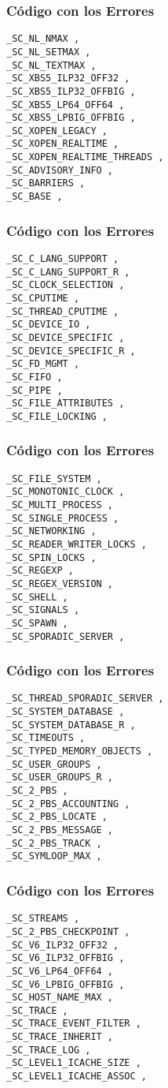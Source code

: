 \documentclass{beamer}
\begin{document}
\begin{frame}[fragile]
\frametitle{C\'odigo con los Errores}
\begin{verbatim}
_SC_NL_NMAX , 
_SC_NL_SETMAX , 
_SC_NL_TEXTMAX , 
_SC_XBS5_ILP32_OFF32 , 
_SC_XBS5_ILP32_OFFBIG , 
_SC_XBS5_LP64_OFF64 , 
_SC_XBS5_LPBIG_OFFBIG , 
_SC_XOPEN_LEGACY , 
_SC_XOPEN_REALTIME , 
_SC_XOPEN_REALTIME_THREADS , 
_SC_ADVISORY_INFO , 
_SC_BARRIERS , 
_SC_BASE , 
\end{verbatim}
\end{frame}
\begin{frame}[fragile]
\frametitle{C\'odigo con los Errores}
\begin{verbatim}
_SC_C_LANG_SUPPORT , 
_SC_C_LANG_SUPPORT_R , 
_SC_CLOCK_SELECTION , 
_SC_CPUTIME , 
_SC_THREAD_CPUTIME , 
_SC_DEVICE_IO , 
_SC_DEVICE_SPECIFIC , 
_SC_DEVICE_SPECIFIC_R , 
_SC_FD_MGMT , 
_SC_FIFO , 
_SC_PIPE , 
_SC_FILE_ATTRIBUTES , 
_SC_FILE_LOCKING , 
\end{verbatim}
\end{frame}
\begin{frame}[fragile]
\frametitle{C\'odigo con los Errores}
\begin{verbatim}
_SC_FILE_SYSTEM , 
_SC_MONOTONIC_CLOCK , 
_SC_MULTI_PROCESS , 
_SC_SINGLE_PROCESS , 
_SC_NETWORKING , 
_SC_READER_WRITER_LOCKS , 
_SC_SPIN_LOCKS , 
_SC_REGEXP , 
_SC_REGEX_VERSION , 
_SC_SHELL , 
_SC_SIGNALS , 
_SC_SPAWN , 
_SC_SPORADIC_SERVER , 
\end{verbatim}
\end{frame}
\begin{frame}[fragile]
\frametitle{C\'odigo con los Errores}
\begin{verbatim}
_SC_THREAD_SPORADIC_SERVER , 
_SC_SYSTEM_DATABASE , 
_SC_SYSTEM_DATABASE_R , 
_SC_TIMEOUTS , 
_SC_TYPED_MEMORY_OBJECTS , 
_SC_USER_GROUPS , 
_SC_USER_GROUPS_R , 
_SC_2_PBS , 
_SC_2_PBS_ACCOUNTING , 
_SC_2_PBS_LOCATE , 
_SC_2_PBS_MESSAGE , 
_SC_2_PBS_TRACK , 
_SC_SYMLOOP_MAX , 
\end{verbatim}
\end{frame}
\begin{frame}[fragile]
\frametitle{C\'odigo con los Errores}
\begin{verbatim}
_SC_STREAMS , 
_SC_2_PBS_CHECKPOINT , 
_SC_V6_ILP32_OFF32 , 
_SC_V6_ILP32_OFFBIG , 
_SC_V6_LP64_OFF64 , 
_SC_V6_LPBIG_OFFBIG , 
_SC_HOST_NAME_MAX , 
_SC_TRACE , 
_SC_TRACE_EVENT_FILTER , 
_SC_TRACE_INHERIT , 
_SC_TRACE_LOG , 
_SC_LEVEL1_ICACHE_SIZE , 
_SC_LEVEL1_ICACHE_ASSOC , 
\end{verbatim}
\end{frame}
\end{document}
